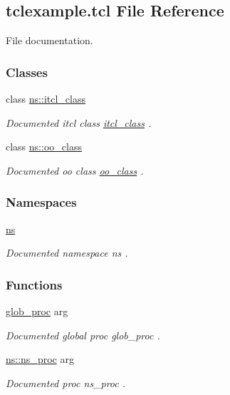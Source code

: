 \hypertarget{tclexample_8tcl}{}\subsection{tclexample.\+tcl File Reference}
\label{tclexample_8tcl}


File documentation.  


\subsubsection*{Classes}
\begin{DoxyCompactItemize}
\item 
class \mbox{\hyperlink{classns_1_1itcl__class}{ns\+::itcl\+\_\+class}}
\begin{DoxyCompactList}\small\item\em Documented itcl class {\ttfamily \mbox{\hyperlink{classns_1_1itcl__class}{itcl\+\_\+class}}} . \end{DoxyCompactList}\item 
class \mbox{\hyperlink{classns_1_1oo__class}{ns\+::oo\+\_\+class}}
\begin{DoxyCompactList}\small\item\em Documented oo class {\ttfamily \mbox{\hyperlink{classns_1_1oo__class}{oo\+\_\+class}}} . \end{DoxyCompactList}\end{DoxyCompactItemize}
\subsubsection*{Namespaces}
\begin{DoxyCompactItemize}
\item 
 \mbox{\hyperlink{namespacens}{ns}}
\begin{DoxyCompactList}\small\item\em Documented namespace {\ttfamily ns} . \end{DoxyCompactList}\end{DoxyCompactItemize}
\subsubsection*{Functions}
\begin{DoxyCompactItemize}
\item 
\mbox{\hyperlink{tclexample_8tcl_a6fd2deb737d7421831004f9302f451ee}{glob\+\_\+proc}} arg
\begin{DoxyCompactList}\small\item\em Documented global proc {\ttfamily glob\+\_\+proc} . \end{DoxyCompactList}\item 
\mbox{\hyperlink{namespacens_a1429cbe84d32b17ea4783e5c5c00615b}{ns\+::ns\+\_\+proc}} arg
\begin{DoxyCompactList}\small\item\em Documented proc {\ttfamily ns\+\_\+proc} . \end{DoxyCompactList}\end{DoxyCompactItemize}


